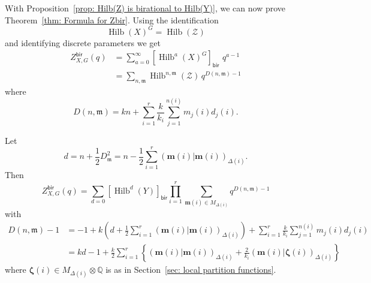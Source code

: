 \documentclass{amsart}
\theoremstyle{definition}
\newcommand{\half}{\frac{1}{2}}
\newcommand{\QQ} {{\mathbb Q}}		%
\newcommand{\bir}{\mathsf{bir}}
\newcommand{\mdata}{\mathfrak{m}}
\newcommand{\Zcal}{\mathcal{Z}}
\newcommand{\mvec}{\bm{m}}
\newcommand{\zetavec}{\bm{\zeta }}
\newcommand{\Hilb}{\operatorname{Hilb}}
\begin{document}
With Proposition~\ref{prop: Hilb(Z) is birational to Hilb(Y)}, we can now prove Theorem~\ref{thm: Formula for
Zbir}.  Using the identification \[\Hilb(X)^{G} = \Hilb (\Zcal )\]
and identifying discrete parameters we get
\begin{align*}
Z^{\bir}_{X,G}(q)& = \sum_{a=0}^{\infty} \left[\Hilb^{a}(X)^{G}
\right]_{\bir} \, \, q^{a-1} \\
& = \sum_{n,\mdata} \Hilb^{n,\mdata}(\Zcal )\,  q^{D(n,\mdata )-1}
\end{align*}
where
\[
D(n,\mdata ) = kn +\sum_{i=1}^{r}\frac{k}{k_{i}}\sum_{j=1}^{n(i)}
m_{j}(i) d_{j}(i).  
\]
\begin{comment}
We can organize the data $\mdata = \left\{m_{j}(i) \right\}$ into
$\mvec (i)\in M_{\Delta (i)}$, i.e.  the vectors in the root lattice
of $\Delta (i)$ having components $ m_{1}(i),\dotsc
,m_{n(i)}(i)$. Under this identification, we see that
\[
D_{\mdata}^{2} = -\sum_{i=1}^{r} \left(\mvec (i)|\mvec (i)
\right)_{\Delta (i)} 
\]
since the intersection form of the exceptional curves over $p_{i}$ is
the negative of the corresponding Cartan matrix $C_{\Delta (i)}$. 
\end{comment}
Let
\[
d=n+\half D_{\mdata}^{2} = n-\half \sum_{i=1}^{r} \left(\mvec (i)|\mvec (i)
\right)_{\Delta (i)} .
\]
Then
\[
Z^{\bir}_{X,G}(q) = \sum_{d=0}\left[\Hilb^{d}(Y) \right]_{\bir}
\prod_{i=1}^{r}\sum_{\mvec (i)\in M_{\Delta (i)}} q^{D(n,\mdata )-1} 
\]
with
\begin{align*}
D(n,\mdata )-1& = -1 + k\left(d+\half \sum_{i=1}^{r} \left(\mvec (i)|\mvec (i)
\right)_{\Delta (i)}  \right)
+\sum_{i=1}^{r}\frac{k}{k_{i}}\sum_{j=1}^{n(i)} m_{j}(i) d_{j}(i) \\
&=kd-1 +\frac{k}{2}\sum_{i=1}^{r} \left\{  \left(\mvec (i)|\mvec (i)
\right)_{\Delta (i)} +\frac{2}{k_{i}}  \left(\mvec (i)|\zetavec (i)
\right)_{\Delta (i)} \right\}
\end{align*}
where $\zetavec (i) \in M_{\Delta (i)}\otimes \QQ $ is as in
Section~\ref{sec: local partition functions}. 
\end{document}
